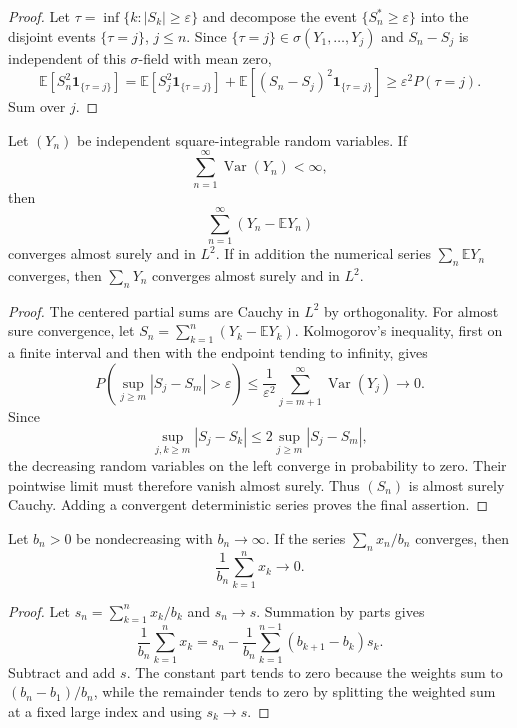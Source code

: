 \begin{proof}
Let $\tau=\inf\{k:|S_k|\geq\varepsilon\}$ and decompose the event
$\{S_n^*\geq\varepsilon\}$ into the disjoint events $\{\tau=j\}$,
$j\leq n$. Since $\{\tau=j\}\in\sigma(Y_1,\ldots,Y_j)$ and
$S_n-S_j$ is independent of this $\sigma$-field with mean zero,
\[
\mathbb E[S_n^2\mathbf1_{\{\tau=j\}}]
 =\mathbb E[S_j^2\mathbf1_{\{\tau=j\}}]
  +\mathbb E[(S_n-S_j)^2\mathbf1_{\{\tau=j\}}]
 \geq\varepsilon^2P(\tau=j).
\]
Sum over $j$.
\end{proof}

\begin{thm}
Let $(Y_n)$ be independent square-integrable random variables. If
\[
\sum_{n=1}^{\infty}\operatorname{Var}(Y_n)<\infty,
\]
then
\[
\sum_{n=1}^{\infty}(Y_n-\mathbb EY_n)
\]
converges almost surely and in $L^2$. If in addition the numerical series
$\sum_n\mathbb EY_n$ converges, then $\sum_nY_n$ converges almost surely and
in $L^2$.
\end{thm}

\begin{proof}
The centered partial sums are Cauchy in $L^2$ by orthogonality. For almost
sure convergence, let $S_n=\sum_{k=1}^{n}(Y_k-\mathbb EY_k)$. Kolmogorov's
inequality, first on a finite interval and then with the endpoint tending to
infinity, gives
\[
P\!\left(\sup_{j\geq m}|S_j-S_m|>\varepsilon\right)
 \leq\frac1{\varepsilon^2}
      \sum_{j=m+1}^{\infty}\operatorname{Var}(Y_j)
 \longrightarrow0.
\]
Since
\[
\sup_{j,k\geq m}|S_j-S_k|
 \leq2\sup_{j\geq m}|S_j-S_m|,
\]
the decreasing random variables on the left converge in probability to zero.
Their pointwise limit must therefore vanish almost surely. Thus $(S_n)$ is
almost surely Cauchy. Adding a convergent
deterministic series proves the final assertion.
\end{proof}

\begin{lem}
Let $b_n>0$ be nondecreasing with $b_n\to\infty$. If the series
$\sum_nx_n/b_n$ converges, then
\[
\frac1{b_n}\sum_{k=1}^{n}x_k\longrightarrow0.
\]
\end{lem}

\begin{proof}
Let $s_n=\sum_{k=1}^{n}x_k/b_k$ and $s_n\to s$. Summation by parts gives
\[
\frac1{b_n}\sum_{k=1}^{n}x_k
 =s_n-\frac1{b_n}\sum_{k=1}^{n-1}(b_{k+1}-b_k)s_k.
\]
Subtract and add $s$. The constant part tends to zero because the weights
sum to $(b_n-b_1)/b_n$, while the remainder tends to zero by splitting the
weighted sum at a fixed large index and using $s_k\to s$.
\end{proof}


